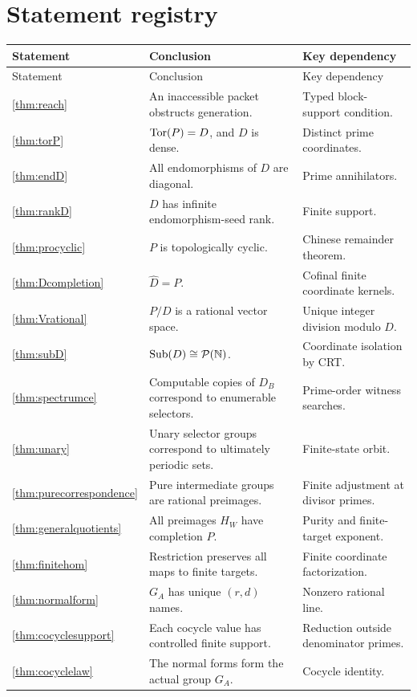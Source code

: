 \section{Statement registry}
\small
\begin{longtable}{@{}>{\raggedright\arraybackslash}p{}>{\raggedright\arraybackslash}p{}>{\raggedright\arraybackslash}p{}@{}}
\toprule
Statement&Conclusion&Key dependency\\\midrule
\endfirsthead
\toprule Statement&Conclusion&Key dependency\\\midrule\endhead
\ref{thm:reach}&An inaccessible packet obstructs generation.&Typed block-support condition.\\
\ref{thm:torP}&$\operatorname{Tor}(P)=D$, and $D$ is dense.&Distinct prime coordinates.\\
\ref{thm:endD}&All endomorphisms of $D$ are diagonal.&Prime annihilators.\\
\ref{thm:rankD}&$D$ has infinite endomorphism-seed rank.&Finite support.\\
\ref{thm:procyclic}&$P$ is topologically cyclic.&Chinese remainder theorem.\\
\ref{thm:Dcompletion}&$\widehat D=P$.&Cofinal finite coordinate kernels.\\
\ref{thm:Vrational}&$P/D$ is a rational vector space.&Unique integer division modulo $D$.\\
\ref{thm:subD}&$\operatorname{Sub}(D)\cong\mathcal P(\mathbb N)$.&Coordinate isolation by CRT.\\
\ref{thm:spectrumce}&Computable copies of $D_B$ correspond to enumerable selectors.&Prime-order witness searches.\\
\ref{thm:unary}&Unary selector groups correspond to ultimately periodic sets.&Finite-state orbit.\\
\ref{thm:purecorrespondence}&Pure intermediate groups are rational preimages.&Finite adjustment at divisor primes.\\
\ref{thm:generalquotients}&All preimages $H_W$ have completion $P$.&Purity and finite-target exponent.\\
\ref{thm:finitehom}&Restriction preserves all maps to finite targets.&Finite coordinate factorization.\\
\ref{thm:normalform}&$G_A$ has unique $(r,d)$ names.&Nonzero rational line.\\
\ref{thm:cocyclesupport}&Each cocycle value has controlled finite support.&Reduction outside denominator primes.\\
\ref{thm:cocyclelaw}&The normal forms form the actual group $G_A$.&Cocycle identity.\\

\end{longtable}
